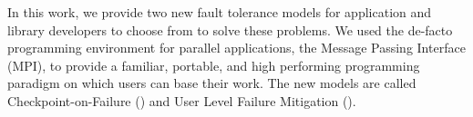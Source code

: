 In this work, we provide two new fault tolerance models for application and
library developers to choose from to solve these problems. We used the de-facto
programming environment for parallel applications, the Message Passing Interface
(MPI), to provide a familiar, portable, and high performing programming paradigm
on which users can base their work. The new models are called
Checkpoint-on-Failure (\cof) and User Level Failure Mitigation (\ulfm). 
